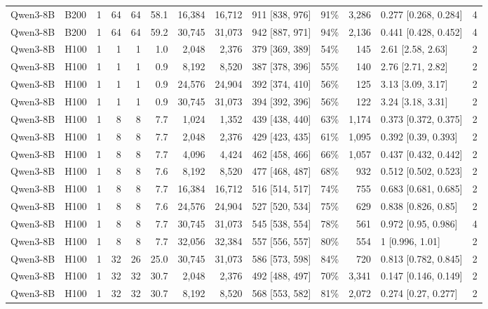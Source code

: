 \begin{landscape}
\begin{longtable}{llrrrrrrlrrlr}
Qwen3-8B & B200 & 1 & 64 & 64 & 58.1 & 16,384 & 16,712 & 911 {[}838, 976{]} & 91\% & 3,286 & 0.277 {[}0.268, 0.284{]} & 4 \\
Qwen3-8B & B200 & 1 & 64 & 64 & 59.2 & 30,745 & 31,073 & 942 {[}887, 971{]} & 94\% & 2,136 & 0.441 {[}0.428, 0.452{]} & 4 \\
Qwen3-8B & H100 & 1 & 1 & 1 & 1.0 & 2,048 & 2,376 & 379 {[}369, 389{]} & 54\% & 145 & 2.61 {[}2.58, 2.63{]} & 2 \\
Qwen3-8B & H100 & 1 & 1 & 1 & 0.9 & 8,192 & 8,520 & 387 {[}378, 396{]} & 55\% & 140 & 2.76 {[}2.71, 2.82{]} & 2 \\
Qwen3-8B & H100 & 1 & 1 & 1 & 0.9 & 24,576 & 24,904 & 392 {[}374, 410{]} & 56\% & 125 & 3.13 {[}3.09, 3.17{]} & 2 \\
Qwen3-8B & H100 & 1 & 1 & 1 & 0.9 & 30,745 & 31,073 & 394 {[}392, 396{]} & 56\% & 122 & 3.24 {[}3.18, 3.31{]} & 2 \\
Qwen3-8B & H100 & 1 & 8 & 8 & 7.7 & 1,024 & 1,352 & 439 {[}438, 440{]} & 63\% & 1,174 & 0.373 {[}0.372, 0.375{]} & 2 \\
Qwen3-8B & H100 & 1 & 8 & 8 & 7.7 & 2,048 & 2,376 & 429 {[}423, 435{]} & 61\% & 1,095 & 0.392 {[}0.39, 0.393{]} & 2 \\
Qwen3-8B & H100 & 1 & 8 & 8 & 7.7 & 4,096 & 4,424 & 462 {[}458, 466{]} & 66\% & 1,057 & 0.437 {[}0.432, 0.442{]} & 2 \\
Qwen3-8B & H100 & 1 & 8 & 8 & 7.6 & 8,192 & 8,520 & 477 {[}468, 487{]} & 68\% & 932 & 0.512 {[}0.502, 0.523{]} & 2 \\
Qwen3-8B & H100 & 1 & 8 & 8 & 7.7 & 16,384 & 16,712 & 516 {[}514, 517{]} & 74\% & 755 & 0.683 {[}0.681, 0.685{]} & 2 \\
Qwen3-8B & H100 & 1 & 8 & 8 & 7.6 & 24,576 & 24,904 & 527 {[}520, 534{]} & 75\% & 629 & 0.838 {[}0.826, 0.85{]} & 2 \\
Qwen3-8B & H100 & 1 & 8 & 8 & 7.7 & 30,745 & 31,073 & 545 {[}538, 554{]} & 78\% & 561 & 0.972 {[}0.95, 0.986{]} & 4 \\
Qwen3-8B & H100 & 1 & 8 & 8 & 7.7 & 32,056 & 32,384 & 557 {[}556, 557{]} & 80\% & 554 & 1 {[}0.996, 1.01{]} & 2 \\
Qwen3-8B & H100 & 1 & 32 & 26 & 25.0 & 30,745 & 31,073 & 586 {[}573, 598{]} & 84\% & 720 & 0.813 {[}0.782, 0.845{]} & 2 \\
Qwen3-8B & H100 & 1 & 32 & 32 & 30.7 & 2,048 & 2,376 & 492 {[}488, 497{]} & 70\% & 3,341 & 0.147 {[}0.146, 0.149{]} & 2 \\
Qwen3-8B & H100 & 1 & 32 & 32 & 30.7 & 8,192 & 8,520 & 568 {[}553, 582{]} & 81\% & 2,072 & 0.274 {[}0.27, 0.277{]} & 2 \\

\end{longtable}
\end{landscape}

